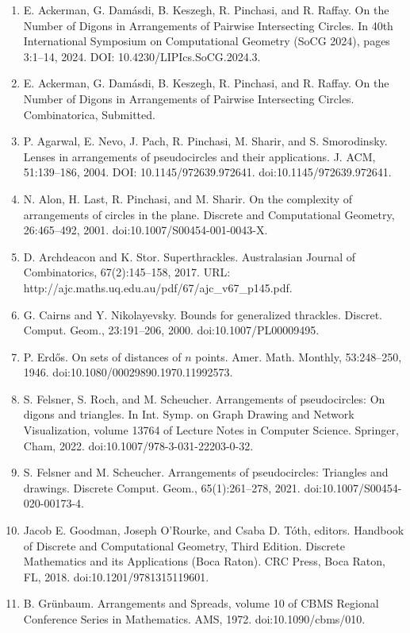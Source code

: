 \documentclass[10pt,a4paper]{amsart}
\begin{document}
\begin{enumerate}
\item[]  [1]  E. Ackerman, G. Damásdi, B. Keszegh, R. Pinchasi, and R. Raffay.  On the Number of Digons in Arrangements of Pairwise Intersecting Circles.  In 40th International Symposium on Computational Geometry (SoCG 2024), pages 3:1–14, 2024.  DOI: 10.4230/LIPIcs.SoCG.2024.3.  
\item[]  [2]  E. Ackerman, G. Damásdi, B. Keszegh, R. Pinchasi, and R. Raffay.  On the Number of Digons in Arrangements of Pairwise Intersecting Circles.  Combinatorica, Submitted.  
\item[]  [3]  P. Agarwal, E. Nevo, J. Pach, R. Pinchasi, M. Sharir, and S. Smorodinsky.  Lenses in arrangements of pseudocircles and their applications.  J. ACM, 51:139–186, 2004.  DOI: 10.1145/972639.972641.  doi:10.1145/972639.972641.  
\item[]  [4]  N. Alon, H. Last, R. Pinchasi, and M. Sharir.  On the complexity of arrangements of circles in the plane.  Discrete and Computational Geometry, 26:465–492, 2001.  doi:10.1007/S00454-001-0043-X.  
\item[]  [5]  D. Archdeacon and K. Stor.  Superthrackles.  Australasian Journal of Combinatorics, 67(2):145–158, 2017.  URL: http://ajc.maths.uq.edu.au/pdf/67/ajc\_v67\_p145.pdf.  
\item[]  [6]  G. Cairns and Y. Nikolayevsky.  Bounds for generalized thrackles.  Discret. Comput. Geom., 23:191–206, 2000.  doi:10.1007/PL00009495.  
\item[]  [7]  P. Erdős.  On sets of distances of $n$ points.  Amer. Math. Monthly, 53:248–250, 1946.  doi:10.1080/00029890.1970.11992573.  
\item[]  [8]  S. Felsner, S. Roch, and M. Scheucher.  Arrangements of pseudocircles: On digons and triangles.  In Int. Symp. on Graph Drawing and Network Visualization, volume 13764 of Lecture Notes in Computer Science. Springer, Cham, 2022.  doi:10.1007/978-3-031-22203-0-32.  
\item[]  [9]  S. Felsner and M. Scheucher.  Arrangements of pseudocircles: Triangles and drawings.  Discrete Comput. Geom., 65(1):261–278, 2021.  doi:10.1007/S00454-020-00173-4.  
\item[]  [10]  Jacob E. Goodman, Joseph O’Rourke, and Csaba D. Tóth, editors.  Handbook of Discrete and Computational Geometry, Third Edition.  Discrete Mathematics and its Applications (Boca Raton). CRC Press, Boca Raton, FL, 2018.  doi:10.1201/9781315119601.  
\item[]  [11]  B. Grünbaum.  Arrangements and Spreads, volume 10 of CBMS Regional Conference Series in Mathematics.  AMS, 1972.  doi:10.1090/cbms/010.  

\end{enumerate}
\end{document}
